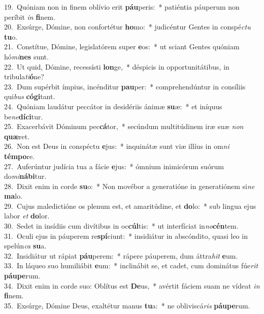 {19.~}Quóniam non in finem oblívio erit \textbf{páu}peris:~* patiéntia páuperum non períbit \textit{in} \textbf{fi}nem.\\
{20.~}Exsúrge, Dómine, non confortétur \textbf{ho}mo:~* judicéntur Gentes in conspé\textit{ctu} \textbf{tu}o.\\
{21.~}Constítue, Dómine, legislatórem super \textbf{e}os:~* ut sciant Gentes quóniam hó\textit{mi}\textbf{nes} sunt.\\
{22.~}Ut quid, Dómine, recessísti \textbf{lon}ge,~* déspicis in opportunitátibus, in tribula\textit{ti}\textbf{ó}ne?\\
{23.~}Dum supérbit ímpius, incénditur \textbf{pau}per:~* comprehendúntur in consíliis qui\textit{bus} \textbf{có}\textbf{gi}tant.\\
{24.~}Quóniam laudátur peccátor in desidériis ánimæ \textbf{su}æ:~* et iníquus be\textit{ne}\textbf{dí}\textbf{ci}tur.\\
{25.~}Exacerbávit Dóminum pec\textbf{cá}tor,~* secúndum multitúdinem iræ suæ \textit{non} \textbf{quæ}ret.\\
{26.~}Non est Deus in conspéctu \textbf{e}jus:~* inquinátæ sunt viæ illíus in om\textit{ni} \textbf{tém}\textbf{po}re.\\
{27.~}Auferúntur judícia tua a fácie \textbf{e}jus:~* ómnium inimicórum suórum do\textit{mi}\textbf{ná}\textbf{bi}tur.\\
{28.~}Dixit enim in corde \textbf{su}o:~* Non movébor a generatióne in generatiónem si\textit{ne} \textbf{ma}lo.\\
{29.~}Cujus maledictióne os plenum est, et amaritúdine, et \textbf{do}lo:~* sub lingua ejus labor \textit{et} \textbf{do}lor.\\
{30.~}Sedet in insídiis cum divítibus in oc\textbf{cúl}tis:~* ut interfíciat in\textit{no}\textbf{cén}tem.\\
{31.~}Oculi ejus in páuperem re\textbf{spí}ciunt:~* insidiátur in abscóndito, quasi leo in spelún\textit{ca} \textbf{su}a.\\
{32.~}Insidiátur ut rápiat \textbf{páu}perem:~* rápere páuperem, dum áttra\textit{hit} \textbf{e}um.\\
{33.~}In láqueo suo humiliábit \textbf{e}um:~* inclinábit se, et cadet, cum dominátus fúe\textit{rit} \textbf{páu}\textbf{pe}rum.\\
{34.~}Dixit enim in corde suo: Oblítus est \textbf{De}us,~* avértit fáciem suam ne vídeat \textit{in} \textbf{fi}nem.\\
{35.~}Exsúrge, Dómine Deus, exaltétur manus \textbf{tu}a:~* ne obliviscá\textit{ris} \textbf{páu}\textbf{pe}rum.\\
